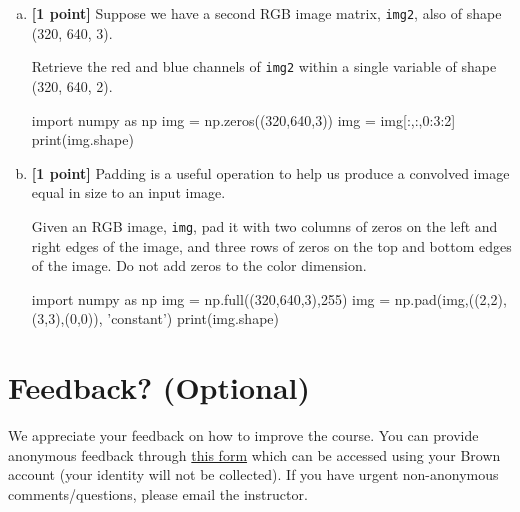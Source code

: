 \documentclass[11pt]{article}
\begin{document}
\begin{enumerate}[(a)]
    \pagebreak
    \item \textbf{[1 point]} Suppose we have a second RGB image matrix, \texttt{img2}, also of shape (320, 640, 3).
    
    \begin{tcolorbox}[colback=orange!5!white,colframe=orange!75!black]
    Retrieve the red and blue channels of \texttt{img2} within a single variable of shape (320, 640, 2).
    \end{tcolorbox}
    
    \begin{tcolorbox}[colback=white!5!white,colframe=green!75!black,height=2cm]
    \begin{python}
    import numpy as np
    img = np.zeros((320,640,3))
    img = img[:,:,0:3:2]
    print(img.shape)
    \end{python}
    \end{tcolorbox}
    
    \item \textbf{[1 point]} Padding is a useful operation to help us produce a convolved image equal in size to an input image. 
    
    \begin{tcolorbox}[colback=orange!5!white,colframe=orange!75!black]
    Given an RGB image, \texttt{img}, pad it with two columns of zeros on the left and right edges of the image, and three rows of zeros on the top and bottom edges of the image. Do not add zeros to the color dimension.
    \end{tcolorbox}
    
    \begin{tcolorbox}[colback=white!5!white,colframe=green!75!black,height=2cm]
    \begin{python}
    import numpy as np
    img = np.full((320,640,3),255)
    img = np.pad(img,((2,2),(3,3),(0,0)), 'constant')
    print(img.shape)
    \end{python}
    \end{tcolorbox}
    
\end{enumerate}


\pagebreak
\section*{Feedback? (Optional)}
We appreciate your feedback on how to improve the course. You can provide anonymous feedback through \href{https://forms.gle/uwBwicWfkYH9v6BU6}{this form} which can be accessed using your Brown account (your identity will not be collected). If you have urgent non-anonymous comments/questions, please email the instructor. 
\end{document}
